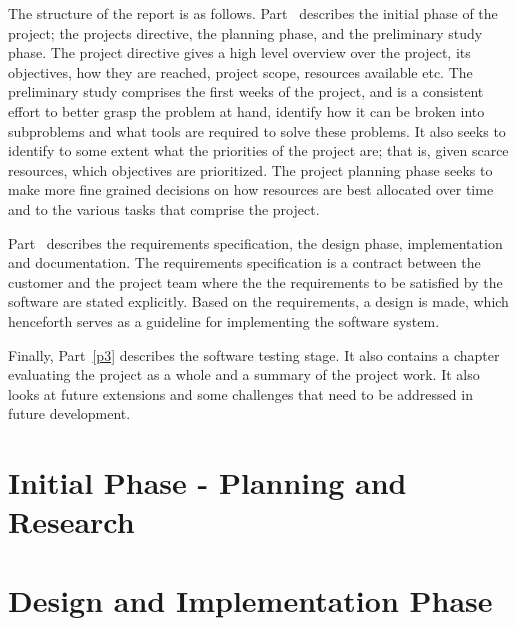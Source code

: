\documentclass[11pt]{book}
\begin{document}
The structure of the report is as follows. Part~\ref{p1} describes the initial phase of the project; the projects directive, the planning phase, and the preliminary study phase. The project directive gives a high level overview over the project, its objectives, how they are reached, project scope, resources available etc. The preliminary study comprises the first weeks of the project, and is a consistent effort to better grasp the problem at hand, identify how it can be broken into subproblems and what tools are required to solve these problems. It also seeks to identify to some extent what the priorities of the project are; that is, given scarce resources, which objectives are prioritized. The project planning phase seeks to make more fine grained decisions on how resources are best allocated over time and to the various tasks that comprise the project.

Part~\ref{p2} describes the requirements specification, the design phase, implementation and documentation. The requirements specification is a contract between the customer and the project team where the the requirements to be satisfied by the software are stated explicitly. Based on the requirements, a design is made, which henceforth serves as a guideline for implementing the software system.

Finally, Part~\ref{p3} describes the software testing stage. It also
contains a chapter evaluating the project as a whole and a summary of
the project work. It also looks at future extensions and some
challenges that need to be addressed in future development.

\part{Initial Phase - Planning and Research}\label{p1}
\addtocounter{chapter}{1}
\setcounter{section}{0}


\setcounter{section}{0}
\addtocounter{chapter}{1}


\setcounter{section}{0}
\addtocounter{chapter}{1}


\part{Design and Implementation Phase}\label{p2}
\setcounter{section}{0}
\addtocounter{chapter}{1}


\setcounter{section}{0}
\addtocounter{chapter}{1}

\end{document}
